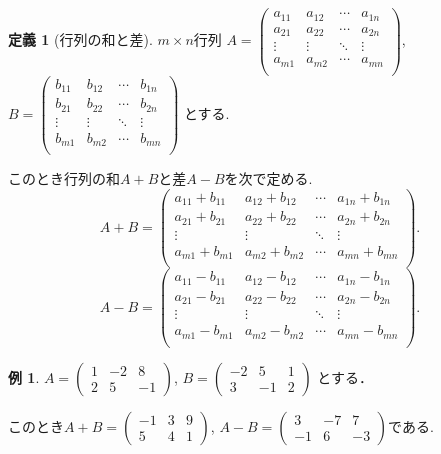 \documentclass[dvipdfmx,a4paper,11pt]{article}
\theoremstyle{definition}
\newtheorem{dfn}[thm]{定義}
\newtheorem{exa}[thm]{例}
\begin{document}
 \begin{tcolorbox}[
    colback = white,
    colframe = green!35!black,
    fonttitle = \bfseries,
    breakable = true]
    \begin{dfn}[行列の和と差]
    \text{}
 
$m \times n$行列
$
A=\begin{pmatrix}
a_{11}& a_{12} & \cdots &a_{1n} \\
a_{21}& a_{22} & \cdots &a_{2n} \\
\vdots& \vdots	&	\ddots   &	\vdots \\
a_{m1}& a_{m2} & \cdots &a_{mn} \\
\end{pmatrix}
$, 
$
B=\begin{pmatrix}
b_{11}& b_{12} & \cdots &b_{1n} \\
b_{21}& b_{22} & \cdots &b_{2n} \\
\vdots& \vdots	&	\ddots   &	\vdots \\
b_{m1}& b_{m2} & \cdots &b_{mn} \\
\end{pmatrix}
$
とする.

このとき行列の和$A+B$と差$A-B$を次で定める.
$$
A+B=
\begin{pmatrix}
a_{11}+b_{11}& a_{12}+b_{12}& \cdots &a_{1n} +b_{1n}\\
a_{21}+b_{21}& a_{22}+b_{22}& \cdots &a_{2n}+b_{2n} \\
\vdots& \vdots	&	\ddots   &	\vdots \\
a_{m1}+b_{m1}& a_{m2} +b_{m2}& \cdots &a_{mn} +b_{mn}\\
\end{pmatrix}.
$$
$$
A-B=
\begin{pmatrix}
a_{11}-b_{11}& a_{12}-b_{12}& \cdots &a_{1n} -b_{1n}\\
a_{21}-b_{21}& a_{22}-b_{22}& \cdots &a_{2n}-b_{2n} \\
\vdots& \vdots	&	\ddots   &	\vdots \\
a_{m1}-b_{m1}& a_{m2}-b_{m2}& \cdots &a_{mn}-b_{mn}\\
\end{pmatrix}.
$$
  \end{dfn}
 \end{tcolorbox}
 
 \begin{exa}
 $A = 
 \begin{pmatrix}
 1 &-2&8 \\
 2&5&-1
 \end{pmatrix}
 $, 
 $
 B = 
 \begin{pmatrix}
 -2&5&1 \\
 3&-1&2
 \end{pmatrix}
 $
 とする．
 
 このとき$
 A+B =
 \begin{pmatrix}
 -1 &3&9 \\
 5&4&1
 \end{pmatrix}
 $, 
 $
  A-B =
 \begin{pmatrix}
 3 &-7&7 \\
 -1&6&-3
 \end{pmatrix}
 $である.
 \end{exa}
\end{document}
